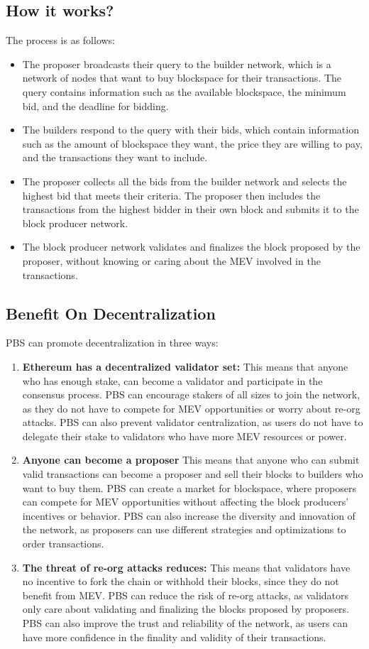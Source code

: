 \subsection{How it works?}
The process is as follows:
\begin{itemize}
	\item The proposer broadcasts their query to the builder network, which is a network of nodes that want to buy blockspace for their transactions. The query contains information such as the available blockspace, the minimum bid, and the deadline for bidding.
	\item The builders respond to the query with their bids, which contain information such as the amount of blockspace they want, the price they are willing to pay, and the transactions they want to include.
	\item The proposer collects all the bids from the builder network and selects the highest bid that meets their criteria. The proposer then includes the transactions from the highest bidder in their own block and submits it to the block producer network.
	\item The block producer network validates and finalizes the block proposed by the proposer, without knowing or caring about the MEV involved in the transactions.
\end{itemize}
\subsection{Benefit On Decentralization}
PBS can promote decentralization in three ways:\\
\begin{enumerate}
	\item \textbf{Ethereum has a decentralized validator set:} This means that anyone who has enough stake, can become a validator and participate in the consensus process. PBS can encourage stakers of all sizes to join the network, as they do not have to compete for MEV opportunities or worry about re-org attacks. PBS can also prevent validator centralization, as users do not have to delegate their stake to validators who have more MEV resources or power.
	\item \textbf{Anyone can become a proposer} This means that anyone who can submit valid transactions can become a proposer and sell their blocks to builders who want to buy them. PBS can create a market for blockspace, where proposers can compete for MEV opportunities without affecting the block producers’ incentives or behavior. PBS can also increase the diversity and innovation of the network, as proposers can use different strategies and optimizations to order transactions.
	\item \textbf{The threat of re-org attacks reduces:} This means that validators have no incentive to fork the chain or withhold their blocks, since they do not benefit from MEV. PBS can reduce the risk of re-org attacks, as validators only care about validating and finalizing the blocks proposed by proposers. PBS can also improve the trust and reliability of the network, as users can have more confidence in the finality and validity of their transactions.
\end{enumerate}
